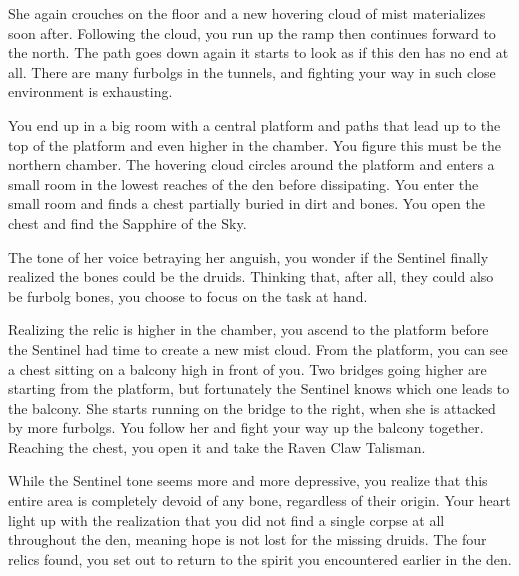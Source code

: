 
She again crouches on the floor and a new hovering cloud of mist materializes soon after. Following the cloud, you run up the ramp then continues forward to the north. The path goes down again it starts to look as if this den has no end at all. There are many furbolgs in the tunnels, and fighting your way in such close environment is exhausting.

You end up in a big room with a central platform and paths that lead up to the top of the platform and even higher in the chamber. You figure this must be the northern chamber. The hovering cloud circles around the platform and enters a small room in the lowest reaches of the den before dissipating. You enter the small room and finds a chest partially buried in dirt and bones. You open the chest and find the Sapphire of the Sky.


The tone of her voice betraying her anguish, you wonder if the Sentinel finally realized the bones could be the druids. Thinking that, after all, they could also be furbolg bones, you choose to focus on the task at hand.



Realizing the relic is higher in the chamber, you ascend to the platform before the Sentinel had time to create a new mist cloud. From the platform, you can see a chest sitting on a balcony high in front of you. Two bridges going higher are starting from the platform, but fortunately the Sentinel knows which one leads to the balcony. She starts running on the bridge to the right, when she is attacked by more furbolgs. You follow her and fight your way up the balcony together. Reaching the chest, you open it and take the Raven Claw Talisman.


While the Sentinel tone seems more and more depressive, you realize that this entire area is completely devoid of any bone, regardless of their origin. Your heart light up with the realization that you did not find a single corpse at all throughout the den, meaning hope is not lost for the missing druids. The four relics found, you set out to return to the spirit you encountered earlier in the den.

